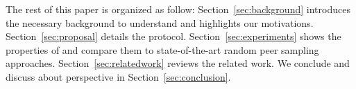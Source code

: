 The rest of this paper is organized as follow: Section~\ref{sec:background}
introduces the necessary background to understand \SCAMPLON{} and highlights
our motivations. Section~\ref{sec:proposal} details the \SCAMPLON{} protocol.
Section~\ref{sec:experiments} shows the properties of \SCAMPLON{} and compare
them to state-of-the-art random peer sampling
approaches. Section~\ref{sec:relatedwork} reviews the related work. We conclude
and discuss about perspective in Section~\ref{sec:conclusion}.

